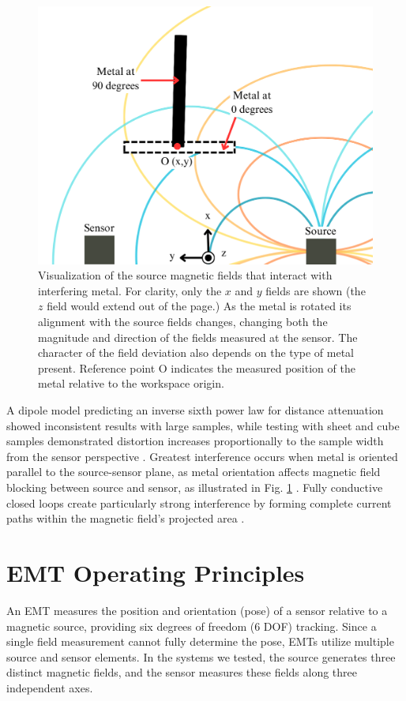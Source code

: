\documentclass[journal,twoside,web]{ieeecolor}
\begin{document}
\begin{figure}[!htbp]
\centerline{\includegraphics[width=\columnwidth]{chaic1.png}}
\caption{Visualization of the source magnetic fields that interact with interfering metal. For clarity, only the $x$ and $y$ fields are shown (the $z$ field would extend out of the page.) As the metal is rotated its alignment with the source fields changes, changing both the magnitude and direction of the fields measured at the sensor. The character of the field deviation also depends on the type of metal present. Reference point O indicates the measured position of the metal relative to the workspace origin.}
\label{magnetic_field}
\end{figure}

A dipole model predicting an inverse sixth power law for distance attenuation showed inconsistent results with large samples, while testing with sheet and cube samples demonstrated distortion increases proportionally to the sample width from the sensor perspective \cite{nixon_effects_1998}. Greatest interference occurs when metal is oriented parallel to the source-sensor plane, as metal orientation affects magnetic field blocking between source and sensor, as illustrated in Fig. \ref{magnetic_field} \cite{nixon_effects_1998}. Fully conductive closed loops create particularly strong interference by forming complete current paths within the magnetic field's projected area \cite{nixon_effects_1998}.

\section{EMT Operating Principles}
An EMT measures the position and orientation (pose) of a sensor relative to a magnetic source, providing six degrees of freedom (6 DOF) tracking. Since a single field measurement cannot fully determine the pose, EMTs utilize multiple source and sensor elements. In the systems we tested, the source generates three distinct magnetic fields, and the sensor measures these fields along three independent axes.
\end{document}
